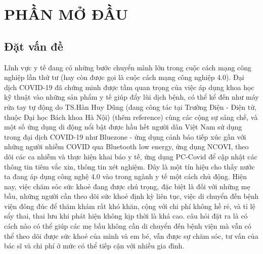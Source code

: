 
\section*{PHẦN MỞ ĐẦU}
\subsection*{Đặt vấn đề}
Lĩnh vực y tế đang có những bước chuyển mình lớn trong cuộc cách mạng công nghiệp lần thứ tư 
(hay còn được gọi là cuộc cách mạng công nghiệp 4.0). Đại dịch COVID-19 đã chứng minh được tầm quan trọng của việc áp dụng
khoa học kỹ thuật vào những sản phẩm y tế giúp đẩy lùi dịch bệnh,
có thể kể đến như máy rửa tay tự động do TS.Hàn Huy Dũng (đang công tác tại Trường Điện - Điện tử, thuộc Đại học Bách khoa Hà Nội) 
(thêm reference) cùng các cộng sự sáng chế, và một số ứng dụng di động
nổi bật được hầu hết người dân Việt Nam sử dụng trong đại dịch COVID-19 như Bluezone - ứng dụng cảnh báo tiếp xúc gần với
những người nhiễm COVID qua Bluetooth low energy, ứng dụng NCOVI, theo dõi các ca nhiễm và thực hiện khai báo y tế, ứng
dụng PC-Covid để cập nhật các thông tin tiêm vắc xin, thông tin xét nghiệm. Đây là một tín hiệu cho thấy nước ta đang áp
dụng công nghệ 4.0 vào trong ngành y tế một cách chủ động. Hiện nay, việc chăm sóc sức khoẻ đang được chú trọng, đặc biệt
là đối với những mẹ bầu, những người cần theo dõi sức khoẻ định kỳ liên tục, việc di chuyển đến bệnh viện đông đúc để
thăm khám rất khó khăn, cộng với chi phí không hề rẻ, và tỉ lệ sẩy thai, thai lưu khi phát hiện không kịp thời là khá cao.
câu hỏi đặt ra là có cách nào có thể giúp các mẹ bầu không cần di chuyển đến bệnh viện mà vẫn có thể theo dõi được sức khoẻ của mình và
em bé, vẫn được sự chăm sóc, tư vấn của bác sĩ và chi phí ở mức có thể tiếp cận với nhiều gia đình. 

